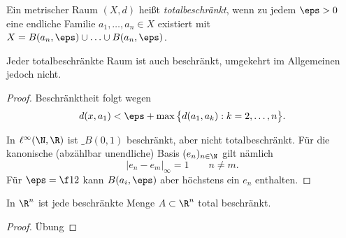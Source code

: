 \begin{df}
	Ein metrischer Raum $(X,d)$ heißt \emph{totalbeschränkt}, wenn zu jedem $\eps > 0$ eine endliche Familie $a_1, \dotsc, a_n \in X$ existiert mit $X = B(a_n,\eps) \cup \dotsc \cup B(a_n,\eps)$.
\end{df}

\begin{nt}
	Jeder totalbeschränkte Raum ist auch beschränkt, umgekehrt im Allgemeinen jedoch nicht.
	\begin{proof}
		Beschränktheit folgt wegen
		\[
			d(x,a_1) < \eps + \max \big\{d(a_1, a_k) : k = 2,\dotsc, n \big\}.
		\]

		In $\ell^\infty(\N, \R)$ ist $\_B(0,1)$ beschränkt, aber nicht totalbeschränkt.
		Für die kanonische (abzählbar unendliche) Basis $(e_n)_{n\in \N}$ gilt nämlich
		\[
			|e_n - e_m|_\infty = 1
			\qquad n \neq m.
		\]
		Für $\eps = \f 12$ kann $B(a_i,\eps)$ aber höchstens ein $e_n$ enthalten.
	\end{proof}
\end{nt}

\begin{prop}
	In $\R^n$ ist jede beschränkte Menge $A \subset \R^n$ total beschränkt.
	\begin{proof}
		Übung
	\end{proof}
\end{prop}

